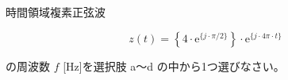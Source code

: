 時間領域複素正弦波

\[
z(t) =  \left \{ 4 \cdot \textrm{e}^{\{j \cdot \pi/2 \}} \right \} \cdot \textrm{e}^{\{ j \cdot 4 \pi \cdot t \}}
\]

\bigskip
\noindent の周波数 $f$ [Hz]を選択肢 a〜d の中から1つ選びなさい。
